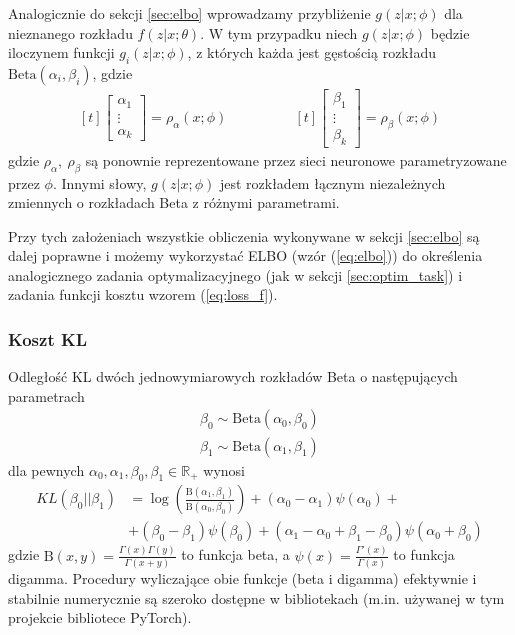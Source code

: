 \documentclass{iithesis}
\begin{document}
Analogicznie do sekcji \ref{sec:elbo} wprowadzamy przybliżenie $g(z|x;\phi)$
dla nieznanego rozkładu $f(z|x;\theta)$. W tym przypadku niech $g(z|x;\phi)$
będzie iloczynem funkcji $g_i(z|x;\phi)$, z których każda jest gęstością rozkładu
$\text{Beta}(\alpha_i, \beta_i)$, gdzie
\begin{equation*}
\begin{aligned}[t]
\begin{bmatrix}
\alpha_1 \\
\vdots \\
\alpha_k
\end{bmatrix}
= \rho_\alpha(x;\phi)
\end{aligned}
\qquad \qquad
\begin{aligned}[t]
\begin{bmatrix}
\beta_1 \\
\vdots \\
\beta_k
\end{bmatrix}
= \rho_\beta(x;\phi)
\end{aligned}
\end{equation*}
gdzie $\rho_\alpha,\ \rho_\beta$ są ponownie reprezentowane przez sieci neuronowe
parametryzowane przez $\phi$. Innymi słowy, $g(z|x;\phi)$ jest rozkładem łącznym
niezależnych zmiennych o rozkładach Beta z różnymi parametrami.

Przy tych założeniach wszystkie obliczenia wykonywane w sekcji \ref{sec:elbo}
są dalej poprawne i możemy wykorzystać ELBO (wzór (\ref{eq:elbo})) do
określenia analogicznego zadania optymalizacyjnego (jak w sekcji \ref{sec:optim_task})
i zadania funkcji kosztu wzorem (\ref{eq:loss_f}).

\subsubsection{Koszt KL}
Odległość KL dwóch jednowymiarowych rozkładów Beta o następujących parametrach
\begin{equation*}
\begin{split}
\beta_0 \sim \text{Beta}(\alpha_0, \beta_0) \\
\beta_1 \sim \text{Beta}(\alpha_1, \beta_1)
\end{split}
\end{equation*}
dla pewnych $\alpha_0,\alpha_1,\beta_0,\beta_1 \in \mathbb{R}_{+}$ wynosi
\begin{equation} \label{eq:univariate_beta_kl}
\begin{split}
KL(\beta_0 || \beta_1) &= \log \left( \frac{\text{B}(\alpha_1,\beta_1)}{\text{B}(\alpha_0,\beta_0)} \right)
+ (\alpha_0-\alpha_1)\psi(\alpha_0) +\\
&+ (\beta_0-\beta_1)\psi(\beta_0) + (\alpha_1-\alpha_0+\beta_1-\beta_0)\psi(\alpha_0+\beta_0)
\end{split}
\end{equation}
gdzie $\text{B}(x,y)=\frac{\Gamma(x)\Gamma(y)}{\Gamma(x+y)}$ to funkcja beta,
a $\psi(x)=\frac{\Gamma'(x)}{\Gamma(x)}$ to funkcja digamma.
Procedury wyliczające obie funkcje (beta i digamma) efektywnie i stabilnie numerycznie
są szeroko dostępne w bibliotekach (m.in. używanej w tym projekcie bibliotece PyTorch).
\end{document}
